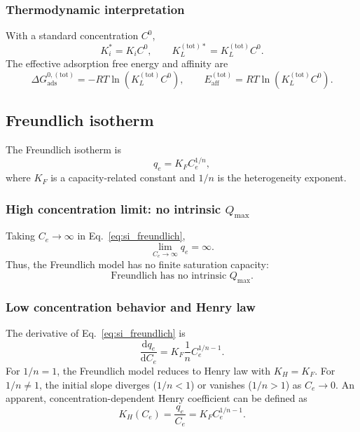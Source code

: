 \documentclass[journal=jacsat,manuscript=article]{achemso}
\begin{document}
\subsubsection{Thermodynamic interpretation}

With a standard concentration \(C^0\),
\begin{equation}
	K_i^{\ast} = K_i C^0,
	\qquad
	K_L^{\mathrm{(tot)}\ast} = K_L^{\mathrm{(tot)}} C^0.
\end{equation}
The effective adsorption free energy and affinity are
\begin{equation}
	\Delta G_{\mathrm{ads}}^{0,\mathrm{(tot)}}
	= - R T \ln\left( K_L^{\mathrm{(tot)}} C^0 \right),
	\qquad
	E_{\mathrm{aff}}^{\mathrm{(tot)}}
	= R T \ln\left( K_L^{\mathrm{(tot)}} C^0 \right).
\end{equation}

\subsection{Freundlich isotherm}
\label{sec:si_freundlich}

The Freundlich isotherm is
\begin{equation}
	q_e = K_F C_e^{1/n},
	\label{eq:si_freundlich}
\end{equation}
where \(K_F\) is a capacity-related constant and \(1/n\) is the
heterogeneity exponent.

\subsubsection{High concentration limit: no intrinsic \(Q_{\max}\)}

Taking \(C_e \to \infty\) in Eq.~\eqref{eq:si_freundlich},
\begin{equation}
	\lim_{C_e \to \infty} q_e = \infty.
\end{equation}
Thus, the Freundlich model has no finite saturation capacity:
\begin{equation}
	\boxed{\text{Freundlich has no intrinsic } Q_{\max}.}
\end{equation}

\subsubsection{Low concentration behavior and Henry law}

The derivative of Eq.~\eqref{eq:si_freundlich} is
\begin{equation}
	\frac{\mathrm{d} q_e}{\mathrm{d} C_e}
	= K_F \frac{1}{n} C_e^{1/n - 1}.
\end{equation}
For \(1/n = 1\), the Freundlich model reduces to Henry law with
\(K_H = K_F\). For \(1/n \neq 1\), the initial slope diverges
(\(1/n < 1\)) or vanishes (\(1/n > 1\)) as \(C_e \to 0\).
An apparent, concentration-dependent Henry coefficient can be defined as
\begin{equation}
	K_H(C_e) = \frac{q_e}{C_e}
	= K_F C_e^{1/n - 1}.
\end{equation}
\end{document}

